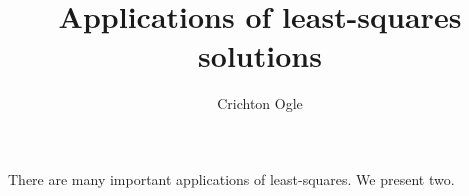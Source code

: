 \documentclass{ximera}
\title{Applications of least-squares solutions}
\author{Crichton Ogle}
\begin{document}
\begin{abstract}
\end{abstract}
\maketitle

There are many important applications of least-squares. We present two.
\end{document}

